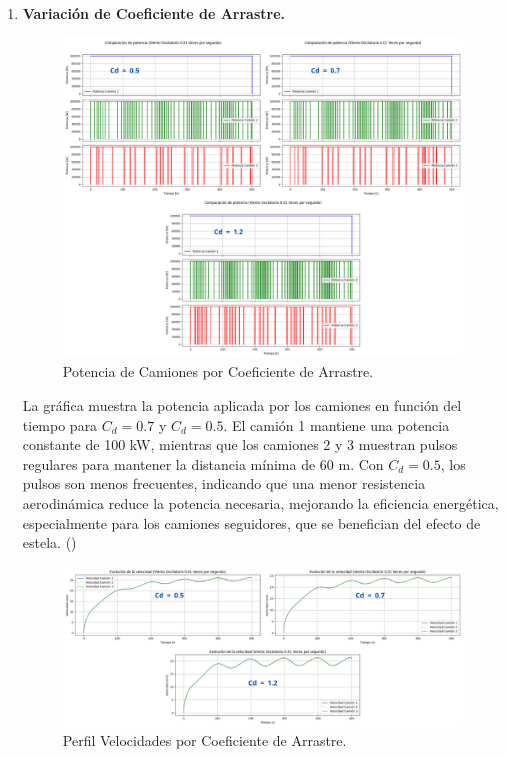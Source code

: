 \documentclass[11pt,stdletter,orderfromtodate,sigleft,twoside]{report}
\begin{document}
\begin{enumerate}
    \item \textbf{Variación de Coeficiente de Arrastre.}

    \begin{figure}[H]
        \centering
        \includegraphics[width=0.8\linewidth]{figures//Cars/cd_variacion.png}
        \caption{Potencia de Camiones por Coeficiente de Arrastre.}
        \label{fig:cd _variation}
    \end{figure}
    
    La gráfica muestra la potencia aplicada por los camiones en función del tiempo para \(C_d = 0.7\) y \(C_d = 0.5\). El camión 1 mantiene una potencia constante de 100 kW, mientras que los camiones 2 y 3 muestran pulsos regulares para mantener la distancia mínima de 60 m. Con \(C_d = 0.5\), los pulsos son menos frecuentes, indicando que una menor resistencia aerodinámica reduce la potencia necesaria, mejorando la eficiencia energética, especialmente para los camiones seguidores, que se benefician del efecto de estela. (\cite{aero})

    
    \begin{figure}[H]
        \centering
        \includegraphics[width=0.75\linewidth]{figures//Cars/vel_cds.png}
        \caption{Perfil Velocidades por Coeficiente de Arrastre.}
        \label{fig:enter-label}
    \end{figure}
    

\end{enumerate}
\end{document}
